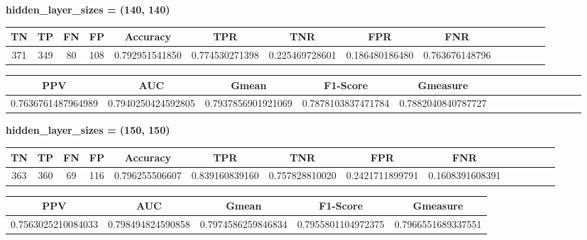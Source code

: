 \documentclass[a4]{article}
\begin{document}
\textbf{hidden\_layer\_sizes = (140, 140)}
\begin{center}
\begin{tabular}{|c|c|c|c|c|c|c|c|c|c|c|c|c|c|}
\hline
\multicolumn{1}{|c|}{\textbf{TN}}& \textbf{TP} & \textbf{FN} & \textbf{FP} & \textbf{Accuracy} & \textbf{TPR} & \textbf{TNR} & \textbf{FPR} &\textbf{FNR} \\ \hline
  371 & 349 & 80 & 108 & 0.792951541850 & 0.774530271398 & 0.225469728601 & 0.186480186480 & 0.763676148796 \\ \hline
\end{tabular}
\end{center}

\begin{center}
\begin{tabular}{|c|c|c|c|c|c|c|c|c|c|c|c|c|c|}
\hline
\multicolumn{1}{|c|}{\textbf{PPV}} & \textbf{AUC} & \textbf{Gmean} & \textbf{F1-Score} & \textbf{Gmeasure}  \\ \hline
  0.7636761487964989 & 0.7940250424592805 & 0.7937856901921069 & 0.7878103837471784 &0.7882040840787727 \\ \hline
\end{tabular}
\end{center}

\textbf{hidden\_layer\_sizes = (150, 150)}
\begin{center}
\begin{tabular}{|c|c|c|c|c|c|c|c|c|c|c|c|c|c|}
\hline
\multicolumn{1}{|c|}{\textbf{TN}}& \textbf{TP} & \textbf{FN} & \textbf{FP} & \textbf{Accuracy} & \textbf{TPR} & \textbf{TNR} & \textbf{FPR} &\textbf{FNR} \\ \hline
  363 & 360 & 69 & 116 & 0.796255506607 & 0.839160839160 & 0.757828810020 & 0.2421711899791 & 0.1608391608391 \\ \hline
\end{tabular}
\end{center}

\begin{center}
\begin{tabular}{|c|c|c|c|c|}
\hline
\multicolumn{1}{|c|}{\textbf{PPV}} & \textbf{AUC} & \textbf{Gmean} & \textbf{F1-Score} & \textbf{Gmeasure}  \\ \hline
  0.7563025210084033 & 0.798494824590858 & 0.7974586259846834 & 0.7955801104972375 & 0.7966551689337551 \\ \hline
\end{tabular}
\end{center}
\end{document}

